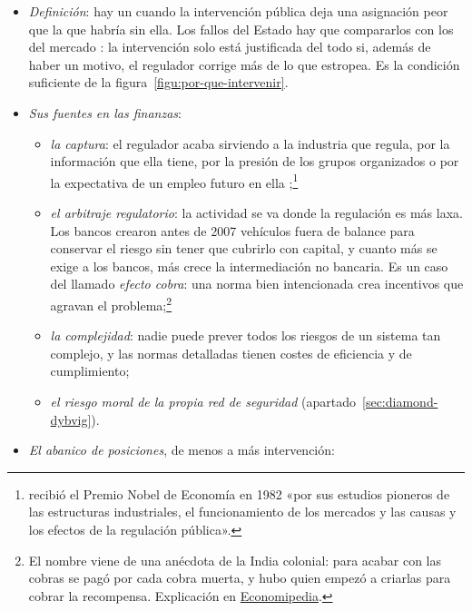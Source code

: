 \documentclass[11pt]{article}
\begin{document}
\begin{itemize}
\item \emph{Definición}: hay un  cuando la intervención pública deja una asignación peor que la que habría sin ella. Los fallos del Estado hay que compararlos con los del mercado : la intervención solo está justificada del todo si, además de haber un motivo, el regulador corrige más de lo que estropea. Es la condición suficiente de la figura~\ref{figu:por-que-intervenir}.
\item \emph{Sus fuentes en las finanzas}:
  \begin{itemize}
  \item \emph{la captura}: el regulador acaba sirviendo a la industria que regula, por la información que ella tiene, por la presión de los grupos organizados o por la expectativa de un empleo futuro en ella \nocite{Stigler1971Theory} ;\footnote{ recibió el Premio Nobel de Economía en 1982 «por sus estudios pioneros de las estructuras industriales, el funcionamiento de los mercados y las causas y los efectos de la regulación pública»\nocite{Nobel1982Stigler}.}
  \item \emph{el arbitraje regulatorio}: la actividad se va donde la regulación es más laxa. Los bancos crearon antes de 2007 vehículos fuera de balance para conservar el riesgo sin tener que cubrirlo con capital\nocite{AcharyaSchnablSuarez2013}, y cuanto más se exige a los bancos, más crece la intermediación no bancaria. Es un caso del llamado \emph{efecto cobra}: una norma bien intencionada crea incentivos que agravan el problema;\footnote{El nombre viene de una anécdota de la India colonial: para acabar con las cobras se pagó por cada cobra muerta, y hubo quien empezó a criarlas para cobrar la recompensa. Explicación en \href{https://economipedia.com/definiciones/efecto-cobra.html}{Economipedia}.}
  \item \emph{la complejidad}: nadie puede prever todos los riesgos de un sistema tan complejo, y las normas detalladas tienen costes de eficiencia y de cumplimiento;
  \item \emph{el riesgo moral de la propia red de seguridad} (apartado~\ref{sec:diamond-dybvig}).
  \end{itemize}
\item \emph{El abanico de posiciones}, de menos a más intervención:
  \begin{itemize}

\end{itemize}
\end{itemize}
\end{document}
